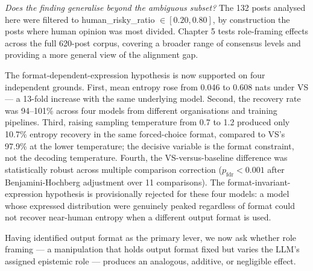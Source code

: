 \textit{Does the finding generalise beyond the ambiguous subset?} The 132
posts analysed here were filtered to human\_risky\_ratio $\in [0.20,
0.80]$, by construction the posts where human opinion was most divided.
Chapter 5 tests role-framing effects across the full 620-post corpus,
covering a broader range of consensus levels and providing a more
general view of the alignment gap.

The format-dependent-expression hypothesis is now supported on four
independent grounds. First, mean entropy rose from 0.046 to 0.608 nats under VS —
a 13-fold increase with the same underlying model. Second, the recovery
rate was 94--101\% across four models from different organisations and
training pipelines. Third, raising sampling temperature from 0.7 to 1.2
produced only 10.7\% entropy recovery in the same forced-choice format,
compared to VS's 97.9\% at the lower temperature; the decisive variable
is the format constraint, not the decoding temperature. Fourth, the
VS-versus-baseline difference was statistically robust across multiple
comparison correction ($p_{\text{fdr}} < 0.001$ after Benjamini-Hochberg
adjustment over 11 comparisons). The format-invariant-expression
hypothesis is provisionally rejected for these four models: a model
whose expressed distribution were genuinely peaked regardless of format
could not recover near-human entropy when a different output format is
used.

Having identified output format as the primary lever, we now ask whether
role framing — a manipulation that holds output format fixed but varies
the LLM's assigned epistemic role — produces an analogous, additive, or
negligible effect.
